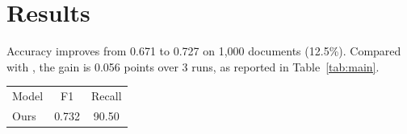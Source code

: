 \section{Results}\label{sec:results2021}
Accuracy improves from 0.671 to 0.727 on 1,000 documents (12.5\%).
Compared with \citet{smith2019}, the gain is 0.056 points
over 3 runs, as reported in Table~\ref{tab:main}.
\begin{table}[t]
\begin{tabular}{lcc}
Model & F1 & Recall \\
Ours & 0.732 & 90.50 \\
\end{tabular}
\end{table}
